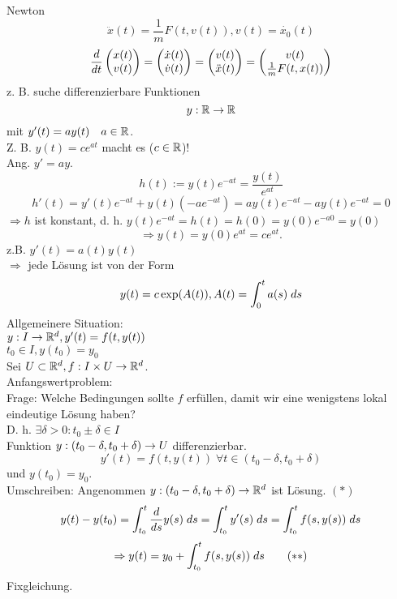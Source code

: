 \documentclass[../ana2.tex]{subfiles}
\begin{document}
\begin{bsp}
    Newton 
    \[ \ddot{x}(t) = \frac{1}{m}F(t, v(t)), v(t) = \dot{x_0}(t) \]
    \[ \ddx{t} \begin{pmatrix}
        x(t) \\ v(t)
    \end{pmatrix} = \begin{pmatrix}
        \dot{x}(t) \\ \dot{v}(t)
    \end{pmatrix} = \begin{pmatrix}
        v(t) \\ \ddot{x}(t)
    \end{pmatrix} = \begin{pmatrix}
        v(t) \\ \frac{1}{m} F(t, x(t))
    \end{pmatrix} \]
    z. B. suche differenzierbare Funktionen 
    \[ \abb{y}{\R}{\R} \]
    mit \( y'(t) = a y(t) \quad a \in \R \).\\
    Z. B. \( y(t) = c e^{at} \) macht es (\(c \in \R\))!\\
    Ang. \( y'= a y \).\\
    \[ h(t) := y(t) e^{-at} = \frac{y(t)}{e^{at}} \]
    \[ h'(t) = y'(t) e^{-at} + y(t)(-a e^{-at})
    = ay(t) e^{-at} - ay(t) e^{-at} = 0 \]
    \( \Rightarrow h \) ist konstant, d. h. 
    \( y(t) e^{-at} = h(t) = h(0) 
    = y(0) e^{-a 0} = y(0) \)
    \[ \Rightarrow y(t) = y(0) e^{at} = c e^{at}. \]
    z.B. \(y'(t) = a(t) y(t)\)\\
    \(\Rightarrow\) jede Lösung ist von der Form
    \[ y(t) = c \exp(A(t)), A(t) = \integralx{a(s)}{0}{t}{s} \]
    Allgemeinere Situation:\\
    \(\abb{y}{I}{\R^d}, y'(t) = f(t, y(t))\)\\
    \( t_0 \in I, y(t_0) = y_0 \)\\
    Sei \(U \subset \R^d, \abb{f}{I\times U}{\R^d}\).\\
    Anfangswertproblem: \\
    Frage: Welche Bedingungen sollte \(f\) erfüllen, damit
    wir eine wenigstens lokal eindeutige Lösung haben?\\
    D. h. \( \exists \delta > 0: t_0 \pm \delta \in I \)\\
    Funktion \( \abb{y}{(t_0 - \delta, t_0 + \delta)}{U} \)
    differenzierbar.
    \[ y'(t) = f(t, y(t)) \;\forall t\in (t_0 - \delta, t_0 + \delta) \]
    und \( y(t_0) = y_0 \).\\
    Umschreiben: Angenommen \(\abb{y}{(t_0-\delta, t_0 + \delta)}{\R^d}\) ist Lösung. \((*)\)\\
    \[ y(t) - y(t_0) = \integralx{\ddx{s}y(s)}{t_0}{t}{s} 
    = \integralx{y'(s)}{t_0}{t}{s} 
    = \integralx{f(s, y(s))}{t_0}{t}{s} \]
    \[ \Rightarrow y(t) = y_0 + \integralx{f(s, y(s))}{t_0}{t}{s} \tag{\(**\)} \]
    Fixgleichung.
\end{bsp}
\end{document}
